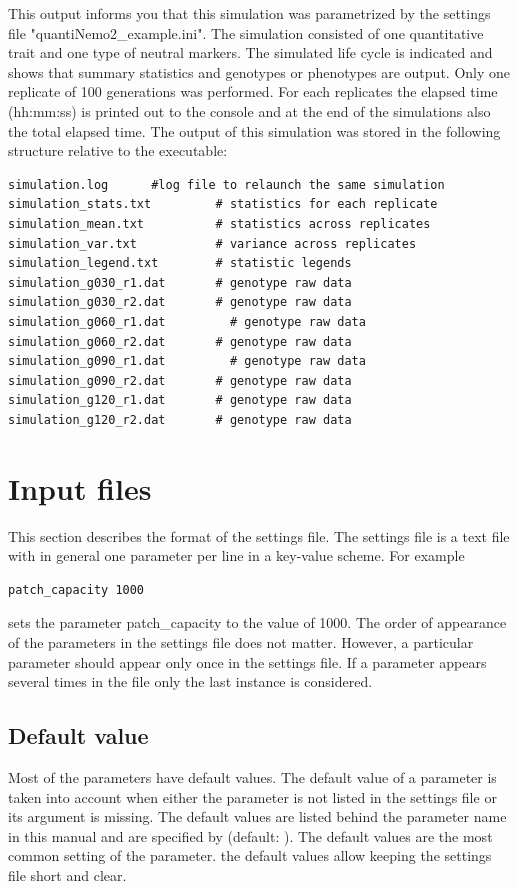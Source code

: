 \documentclass[letterpaper,12pt,oneside]{book}
\begin{document}
This output informs you that this simulation was parametrized by the settings file "quantiNemo2\_example.ini". The simulation consisted of one quantitative trait and one type of neutral markers. The simulated life cycle is indicated and shows that summary statistics and genotypes or phenotypes are output. Only one replicate of 100 generations was performed. For each replicates the elapsed time (hh:mm:ss) is printed out to the console and at the end of the simulations also the total elapsed time. 
The output of this simulation was stored in the following structure relative to the executable:
\begin{lstlisting}[frame=single]
simulation.log      #log file to relaunch the same simulation
simulation_stats.txt         # statistics for each replicate
simulation_mean.txt          # statistics across replicates
simulation_var.txt           # variance across replicates
simulation_legend.txt        # statistic legends
simulation_g030_r1.dat       # genotype raw data 
simulation_g030_r2.dat       # genotype raw data 
simulation_g060_r1.dat         # genotype raw data 
simulation_g060_r2.dat       # genotype raw data 
simulation_g090_r1.dat         # genotype raw data 
simulation_g090_r2.dat       # genotype raw data 
simulation_g120_r1.dat       # genotype raw data 
simulation_g120_r2.dat       # genotype raw data 
\end{lstlisting}
\newpage
\chapter{Input files}\label{chap:InputFiles}
This section describes the format of the settings file. The settings file is a text file with in general one parameter per line in a key-value scheme. For example
\begin{lstlisting}[frame=single]
patch_capacity 1000
\end{lstlisting}
sets the parameter \textsf{patch\_capacity} to the value of 1000. The order of appearance of the parameters in the settings file does not matter. However, a particular parameter should appear only once in the settings file. If a parameter appears several times in the file only the last instance is considered. 

\section{Default value}
Most of the parameters have default values. The default value of a parameter is taken into account when either the parameter is not listed in the settings file or its argument is missing. The default values are listed behind the parameter name in this manual and are specified by \textsf{(default: )}. The default values are the most common setting of the parameter. the default values allow keeping the settings file short and clear.  
\end{document}
